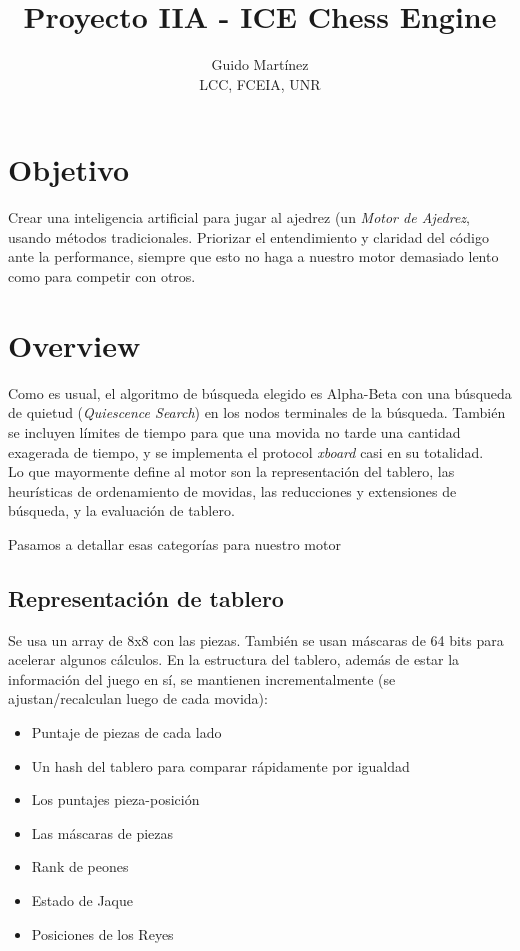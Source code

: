 \documentclass{article}
\begin{document}
\title{Proyecto IIA - ICE Chess Engine}

\author{Guido Martínez \\ LCC, FCEIA, UNR }

\maketitle

\section{Objetivo}

Crear una inteligencia artificial para jugar al ajedrez (un \emph {Motor
de Ajedrez}, usando métodos tradicionales. Priorizar el entendimiento
y claridad del código ante la performance, siempre que esto no haga a
nuestro motor demasiado lento como para competir con otros.

\section{Overview}

Como es usual, el algoritmo de búsqueda elegido es Alpha-Beta con una
búsqueda de quietud (\emph{Quiescence Search}) en los nodos terminales
de la búsqueda.
También se incluyen límites de tiempo para que una movida no tarde una
cantidad exagerada de tiempo, y se implementa el protocol \emph{xboard}
\cite{protocol} casi en su totalidad.
\\

Lo que mayormente define al motor son la representación del tablero,
las heurísticas de ordenamiento de movidas, las reducciones y
extensiones de búsqueda, y la evaluación de tablero.

Pasamos a detallar esas categorías para nuestro motor
\\

\subsection{Representación de tablero}
Se usa un array de 8x8 con las piezas. También se usan máscaras
de 64 bits para acelerar algunos cálculos. En la estructura del
tablero, además de estar la información del juego en sí, se mantienen
incrementalmente (se ajustan/recalculan luego de cada movida):

\begin{itemize}
\item Puntaje de piezas de cada lado
\item Un hash del tablero para comparar rápidamente por igualdad
\item Los puntajes pieza-posición
\item Las máscaras de piezas
\item Rank de peones
\item Estado de Jaque
\item Posiciones de los Reyes
\end{itemize}
\end{document}
